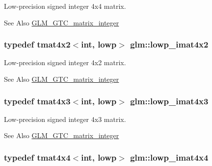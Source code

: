 Low-\/precision signed integer 4x4 matrix. \begin{DoxySeeAlso}{See Also}
\hyperlink{group__gtc__matrix__integer}{G\-L\-M\-\_\-\-G\-T\-C\-\_\-matrix\-\_\-integer} 
\end{DoxySeeAlso}
\hypertarget{group__gtc__matrix__integer_ga87e2118b22cbc6916805aafcda52a943}{
\subsubsection[{lowp\-\_\-imat4x2}]{\setlength{\rightskip}{0pt plus 5cm}typedef tmat4x2$<$int, lowp$>$ {\bf glm\-::lowp\-\_\-imat4x2}}}\label{group__gtc__matrix__integer_ga87e2118b22cbc6916805aafcda52a943}
Low-\/precision signed integer 4x2 matrix. \begin{DoxySeeAlso}{See Also}
\hyperlink{group__gtc__matrix__integer}{G\-L\-M\-\_\-\-G\-T\-C\-\_\-matrix\-\_\-integer} 
\end{DoxySeeAlso}
\hypertarget{group__gtc__matrix__integer_ga76c201715b216ddd5d7de3c3759211f1}{
\subsubsection[{lowp\-\_\-imat4x3}]{\setlength{\rightskip}{0pt plus 5cm}typedef tmat4x3$<$int, lowp$>$ {\bf glm\-::lowp\-\_\-imat4x3}}}\label{group__gtc__matrix__integer_ga76c201715b216ddd5d7de3c3759211f1}
Low-\/precision signed integer 4x3 matrix. \begin{DoxySeeAlso}{See Also}
\hyperlink{group__gtc__matrix__integer}{G\-L\-M\-\_\-\-G\-T\-C\-\_\-matrix\-\_\-integer} 
\end{DoxySeeAlso}
\hypertarget{group__gtc__matrix__integer_ga46f8dc46c3dcde8fa2e8b8f645c0d9ef}{
\subsubsection[{lowp\-\_\-imat4x4}]{\setlength{\rightskip}{0pt plus 5cm}typedef tmat4x4$<$int, lowp$>$ {\bf glm\-::lowp\-\_\-imat4x4}}}\label{group__gtc__matrix__integer_ga46f8dc46c3dcde8fa2e8b8f645c0d9ef}
